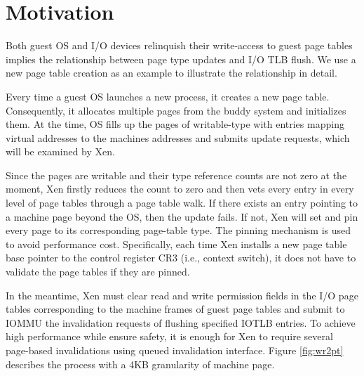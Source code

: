 \section{Motivation}




Both guest OS and I/O devices relinquish their write-access to guest page tables implies the relationship between page type updates and I/O TLB flush. We use a new page table creation as an example to illustrate the relationship in detail.

Every time a guest OS launches a new process, it creates a new page table. Consequently, it allocates multiple pages from the buddy system and initializes them. At the time, OS fills up the pages of writable-type with entries mapping virtual addresses to the machines addresses and submits update requests, which will be examined by Xen.

Since the pages are writable and their type reference counts are not zero at the moment, Xen firstly reduces the count to zero and then vets every entry in every level of page tables through a page table walk. If there exists an entry pointing to a machine page beyond the OS, then the update fails. If not, Xen will set and pin every page to its corresponding page-table type. The pinning mechanism is used to avoid performance cost. Specifically, each time Xen installs a new page table base pointer to the control register CR3 (i.e., context switch), it does not have to validate the page tables if they are pinned.

In the meantime, Xen must clear read and write permission fields in the I/O page tables corresponding to the machine frames of guest page tables and submit to IOMMU the invalidation requests of flushing specified IOTLB entries. To achieve high performance while ensure safety, it is enough for Xen to require several page-based invalidations using queued invalidation interface. Figure \ref{fig:wr2pt} describes the process with a 4KB granularity of machine page.

